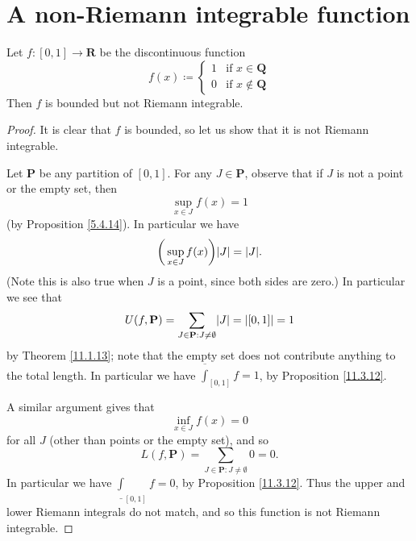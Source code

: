 \section{A non-Riemann integrable function}\label{sec 11.7}

\begin{proposition}\label{11.7.1}
    Let \(f : [0, 1] \to \mathbf{R}\) be the discontinuous function
    \[
        f(x) \coloneqq \begin{cases}
            1 & \text{if } x \in \mathbf{Q} \\
            0 & \text{if } x \notin \mathbf{Q}
        \end{cases}
    \]
    Then \(f\) is bounded but not Riemann integrable.
\end{proposition}

\begin{proof}
    It is clear that \(f\) is bounded, so let us show that it is not Riemann integrable.

    Let \(\mathbf{P}\) be any partition of \([0, 1]\).
    For any \(J \in \mathbf{P}\), observe that if \(J\) is not a point or the empty set, then
    \[
        \sup_{x \in J} f(x) = 1
    \]
    (by Proposition \ref{5.4.14}).
    In particular we have
    \[
        \bigg(\sup_{x \in J} f(x)\bigg) \abs*{J} = \abs*{J}.
    \]
    (Note this is also true when \(J\) is a point, since both sides are zero.)
    In particular we see that
    \[
        U(f, \mathbf{P}) = \sum_{J \in \mathbf{P} : J \neq \emptyset} \abs*{J} = \abs*{[0, 1]} = 1
    \]
    by Theorem \ref{11.1.13};
    note that the empty set does not contribute anything to the total length.
    In particular we have \(\overline{\int}_{[0, 1]} f = 1\), by Proposition \ref{11.3.12}.

    A similar argument gives that
    \[
        \inf_{x \in J} f(x) = 0
    \]
    for all \(J\) (other than points or the empty set), and so
    \[
        L(f, \mathbf{P}) = \sum_{J \in \mathbf{P} : J \neq \emptyset} 0 = 0.
    \]
    In particular we have \(\underline{\int}_{[0, 1]} f = 0\), by Proposition \ref{11.3.12}.
    Thus the upper and lower Riemann integrals do not match, and so this function is not Riemann integrable.
\end{proof}